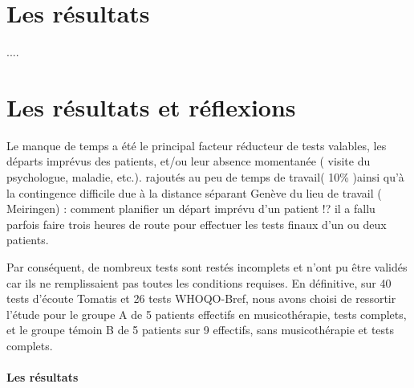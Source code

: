 \begin{enumerate}
 	
 	
 	\section{Les résultats}
 	
 	....
 	
 	
 	
 \section{Les résultats et réflexions}	
Le manque de temps a été le principal facteur  réducteur
de tests valables, les départs imprévus des patients, et/ou leur
absence momentanée ( visite du psychologue, maladie, etc.). rajoutés au peu de temps de travail( 10\% )ainsi qu'à la
contingence difficile due à la distance séparant Genève du lieu de travail ( Meiringen)
: comment planifier un départ imprévu d'un patient !? il a fallu parfois
faire trois heures de route pour effectuer les tests finaux d'un ou deux
patients.
  
Par conséquent,  de nombreux tests sont restés 
incomplets et n'ont pu
être validés car ils ne remplissaient pas toutes les conditions requises.  En définitive, sur 40 tests d'écoute Tomatis et 26 tests
WHOQO-Bref, nous avons choisi de ressortir l'étude pour le groupe A de
5 patients effectifs en musicothérapie, tests complets, et le groupe
témoin B de 5 patients sur 9 effectifs, sans musicothérapie et tests
complets. 
 

  
\paragraph{Les résultats}
  

\end{enumerate}
